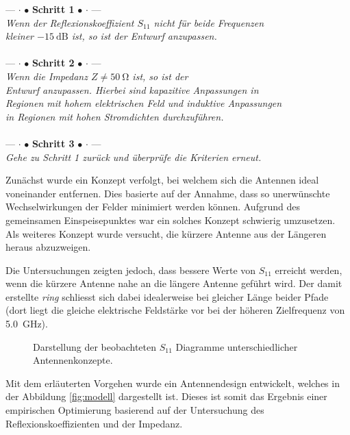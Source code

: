 \begin{center}
	--- $\cdot$ $\bullet$ \textbf{Schritt 1} $\bullet$ $\cdot$ --- \\
	\emph{
		Wenn der Reflexionskoeffizient $S_{11}$ nicht für beide Frequenzen \\
		kleiner $\SI{-15}{\dB}$ ist, so ist der Entwurf anzupassen.} \\ ~ \\
	--- $\cdot$ $\bullet$ \textbf{Schritt 2} $\bullet$ $\cdot$ --- \\
	\emph{
		Wenn die Impedanz $Z \neq \SI{50}{\ohm}$ ist, so ist der \\
		Entwurf anzupassen. Hierbei sind kapazitive Anpassungen in \\
		Regionen mit hohem elektrischen Feld und induktive Anpassungen \\
		in Regionen mit hohen Stromdichten durchzuführen.} \\ ~ \\
	--- $\cdot$ $\bullet$ \textbf{Schritt 3} $\bullet$ $\cdot$ --- \\
	\emph{
		Gehe zu Schritt 1 zurück und überprüfe die Kriterien erneut.}
\end{center}

Zunächst wurde ein Konzept verfolgt, bei welchem sich die Antennen
ideal voneinander entfernen. Dies basierte auf der Annahme, dass so unerwünschte
Wechselwirkungen der Felder minimiert werden können. Aufgrund des gemeinsamen
Einspeisepunktes war ein solches Konzept schwierig umzusetzen. Als weiteres
Konzept wurde versucht, die kürzere Antenne aus der Längeren heraus
abzuzweigen.

Die Untersuchungen zeigten jedoch, dass bessere Werte von $S_{11}$
erreicht werden, wenn die kürzere Antenne nahe an die längere Antenne
geführt wird. Der damit erstellte \emph{ring} schliesst sich dabei
idealerweise bei gleicher Länge beider Pfade (dort liegt die gleiche
elektrische Feldstärke vor bei der höheren Zielfrequenz von
\SI{5.0}{\giga\hertz}).

\begin{figure}[h!]
	\centering
	\footnotesize
	\def\svgscale{0.75}
	
	\caption{Darstellung der beobachteten $S_{11}$ Diagramme unterschiedlicher Antennenkonzepte.}
	\label{fig:antenna_concept_1}
\end{figure}

Mit dem erläuterten Vorgehen wurde ein Antennendesign entwickelt,
welches in der Abbildung \ref{fig:modell} dargestellt ist. Dieses ist
somit das Ergebnis einer empirischen Optimierung basierend auf der
Untersuchung des Reflexionskoeffizienten und der Impedanz.

